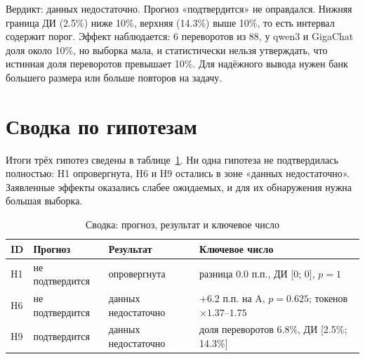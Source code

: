 \documentclass{bmstu}
\begin{document}
\begin{table}[htbp]
\centering
\caption{H9: доля переворотов после возражения}
\label{tab:h9}
\vspace{-10pt}
\end{table}


Вердикт: данных недостаточно. Прогноз «подтвердится» не оправдался. Нижняя граница ДИ (2.5\%) ниже 10\%, верхняя (14.3\%) выше 10\%, то есть интервал содержит порог. Эффект наблюдается: 6 переворотов из 88, у qwen3 и GigaChat доля около 10\%, но выборка мала, и статистически нельзя утверждать, что истинная доля переворотов превышает 10\%. Для надёжного вывода нужен банк большего размера или больше повторов на задачу.

\section{Сводка по гипотезам}
Итоги трёх гипотез сведены в таблице~\ref{tab:hyp_summary}. Ни одна гипотеза не подтвердилась полностью: H1 опровергнута, H6 и H9 остались в зоне «данных недостаточно». Заявленные эффекты оказались слабее ожидаемых, и для их обнаружения нужна большая выборка.

\begin{table}[htbp]
\centering
\caption{Сводка: прогноз, результат и ключевое число}
\label{tab:hyp_summary}
\begin{tabular}{|l|l|l|p{}|}
\hline
ID & Прогноз & Результат & Ключевое число \\
\hline
H1 & не подтвердится & опровергнута & разница 0.0 п.п., ДИ [0; 0], $p=1$ \\
H6 & не подтвердится & данных недостаточно & +6.2 п.п. на A, $p=0.625$; токенов $\times1.37$--$1.75$ \\
H9 & подтвердится & данных недостаточно & доля переворотов 6.8\%, ДИ [2.5\%; 14.3\%] \\
\hline
\end{tabular}
\vspace{-10pt}
\end{table}
\end{document}
